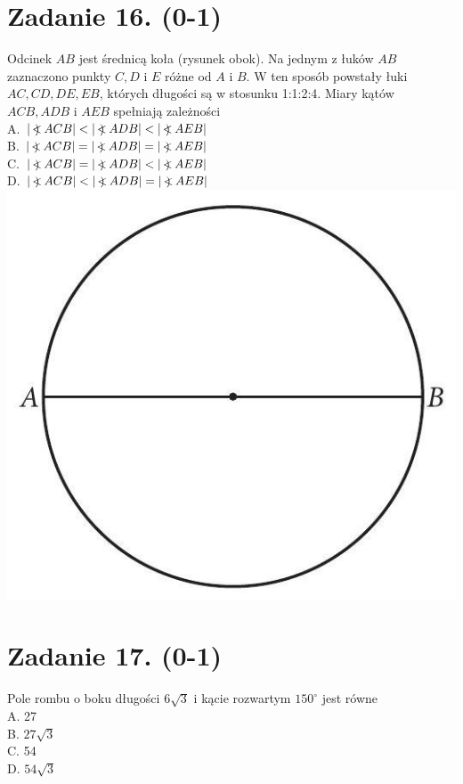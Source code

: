 \documentclass[10pt]{article}
\newcommand\Varangle{\mathop{{<\!\!\!\!\!\text{\small)}}\:}\nolimits}
\begin{document}
\section*{Zadanie 16. (0-1)}
Odcinek \(A B\) jest średnicą koła (rysunek obok). Na jednym z łuków \(A B\) zaznaczono punkty \(C, D\) i \(E\) różne od \(A\) i \(B\). W ten sposób powstały łuki \(A C, C D, D E, E B\), których długości są w stosunku 1:1:2:4. Miary kątów \(A C B, A D B\) i \(A E B\) spełniają zależności\\
A. \(|\Varangle A C B|<|\Varangle A D B|<|\Varangle A E B|\)\\
B. \(|\Varangle A C B|=|\Varangle A D B|=|\Varangle A E B|\)\\
C. \(|\Varangle A C B|=|\Varangle A D B|<|\Varangle A E B|\)\\
D. \(|\Varangle A C B|<|\Varangle A D B|=|\Varangle A E B|\)\\
\includegraphics[max width=\textwidth, center]{2024_11_21_dd21f7544b65bcf1b3c7g-06}

\section*{Zadanie 17. (0-1)}
Pole rombu o boku długości \(6 \sqrt{3}\) i kącie rozwartym \(150^{\circ}\) jest równe\\
A. 27\\
B. \(27 \sqrt{3}\)\\
C. 54\\
D. \(54 \sqrt{3}\)
\end{document}
